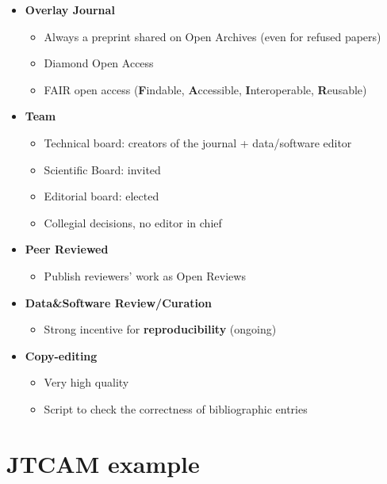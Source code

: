 \documentclass[10pt,compress,serif,aspectratio=169]{beamer}
\begin{document}
\begin{frame}[t]

  
\end{frame}
\begin{frame}[t]
  \begin{itemize}
  \pause
  \item \textbf{Overlay Journal}
   \begin{itemize}
   \item Always a preprint shared on Open Archives (even for refused papers)
   \item Diamond Open Access
   \item FAIR open access (\textbf{F}indable, \textbf{A}ccessible, \textbf{I}nteroperable, \textbf{R}eusable)
   \end{itemize}
   \pause
 \item \textbf{Team}
   \begin{itemize}
   \item Technical board: creators of the journal + data/software editor
   \item Scientific Board: invited
   \item Editorial board: elected
   \item Collegial decisions, no editor in chief
   \end{itemize}
   \pause  
 \item\textbf{Peer Reviewed}
   \begin{itemize}
   \item Publish reviewers' work as Open Reviews
   \end{itemize}
   \pause
 \item\textbf{Data\&Software Review/Curation}
   \begin{itemize}
   \item Strong incentive for \textbf{reproducibility} (ongoing)
   \end{itemize}
   \pause
 \item \textbf{Copy-editing}
   \begin{itemize}
   \item Very high quality
   \item Script to check the correctness of bibliographic entries
   \end{itemize}
 \end{itemize}
\end{frame}



\section{JTCAM example}
\end{document}
